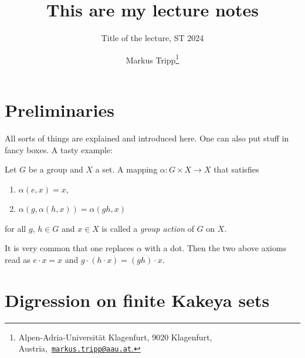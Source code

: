 \documentclass{scrartcl}
\title{This are my lecture notes}
\subtitle{Title of the lecture, ST 2024}
\author{Markus Tripp\thanks{Alpen-Adria-Universität Klagenfurt, 9020 Klagenfurt, Austria,~\href{mailto:markus.tripp@aau.at}{\texttt{markus.tripp@aau.at}.}}}
\begin{document}
\begin{titlepage} 
	\maketitle
	
	

	\thispagestyle{empty}
\end{titlepage}

\tableofcontents 

\newpage
\section{Preliminaries}
\label{sec:prelim}
All sorts of things are explained and introduced here. One can also put stuff in fancy boxes. A tasty example:

\begin{definition}
	Let $G$ be a group and $X$ a set. A mapping $\alpha:G\times X \to X$ that satisfies
	\begin{enumerate}[label=(A\arabic*)]
		\item $\alpha(e,x) = x$,
		\item $\alpha(g,\alpha(h,x))=\alpha(gh,x)$
	\end{enumerate}
	for all $g$, $h \in G$ and $x \in X$ is called a \emph{group action} of $G$ on $X$.
\end{definition}

\begin{remark}
	It is very common that one replaces $\alpha$ with a dot. Then the two above axioms read as $e\cdot x = x$ and $g\cdot (h \cdot x) = (gh) \cdot x$.
\end{remark}

\section{Digression on finite Kakeya sets}
\label{sec:kakeya}
\end{document}
